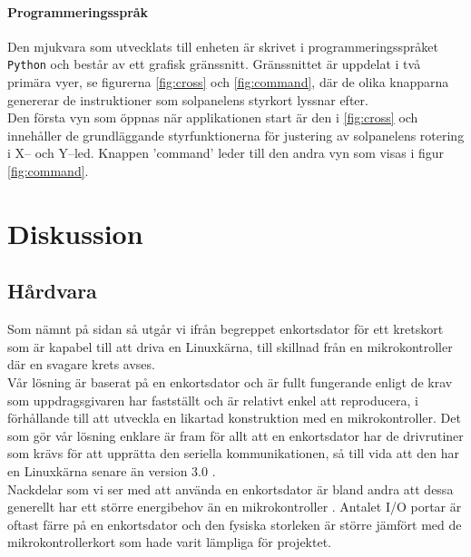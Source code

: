 \documentclass{article}
\begin{document}
        \paragraph{\textrm{Programmeringsspråk}} %
        \label{par:programmeringsspr_k}
            Den mjukvara som utvecklats till enheten är skrivet i programmeringsspråket \texttt{Python} och består av ett grafisk gränssnitt. Gränssnittet är uppdelat i två primära vyer, se figurerna \ref{fig:cross} och \ref{fig:command}, där de olika knapparna genererar de instruktioner som solpanelens styrkort lyssnar efter. \\

            \noindent Den första vyn som öppnas när applikationen start är den i \ref{fig:cross} och innehåller de grundläggande styrfunktionerna för justering av solpanelens rotering i X-- och Y--led. Knappen 'command' leder till den andra vyn som visas i figur \ref{fig:command}.


    \newpage

    \section{Diskussion} %
    \label{sec:diskussion}
        \subsection{Hårdvara} %
        \label{sub:d_hardvara}
        
            Som nämnt på sidan \pageref{sub:beteckningar} så utgår vi ifrån begreppet enkortsdator för ett kretskort som är kapabel till att driva en Linuxkärna, till skillnad från en mikrokontroller där en svagare krets avses.\\

            \noindent Vår lösning är baserat på en enkortsdator och är fullt fungerande enligt de krav som uppdragsgivaren har fastställt och är relativt enkel att reproducera, i förhållande till att utveckla en likartad konstruktion med en mikrokontroller. Det som gör vår lösning enklare är fram för allt att en enkortsdator har de drivrutiner som krävs för att upprätta den seriella kommunikationen, så till vida att den har en Linuxkärna senare än version 3.0 \cite{silicon}. \\

            \noindent Nackdelar som vi ser med att använda en enkortsdator är bland andra att dessa generellt har ett större energibehov än en mikrokontroller \cite{gadgetBlog, rasp}. Antalet I/O portar är oftast färre på en enkortsdator och den fysiska storleken är större jämfört med de mikrokontrollerkort som hade varit lämpliga för projektet.\\
\end{document}
